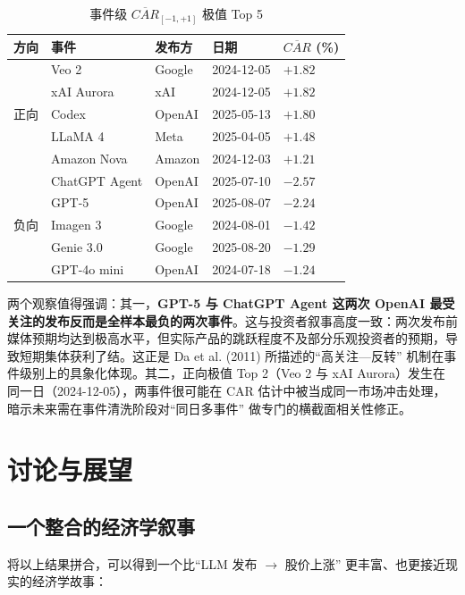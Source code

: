 \documentclass[11pt]{ctexart}
\begin{document}
\begin{table}[htbp]
\centering
\caption{事件级 $\overline{CAR}_{[-1,+1]}$ 极值 Top 5}
\label{tab:extreme}
\small
\begin{tabular}{llll>{\centering\arraybackslash}p{2.2cm}}
\toprule
方向 & 事件 & 发布方 & 日期 & $\overline{CAR}$ (\%) \\
\midrule
\multirow{5}{*}{正向}
  & Veo 2       & Google    & 2024-12-05 & $+1.82$ \\
  & xAI Aurora  & xAI       & 2024-12-05 & $+1.82$ \\
  & Codex       & OpenAI    & 2025-05-13 & $+1.80$ \\
  & LLaMA 4     & Meta      & 2025-04-05 & $+1.48$ \\
  & Amazon Nova & Amazon    & 2024-12-03 & $+1.21$ \\
\midrule
\multirow{5}{*}{负向}
  & ChatGPT Agent & OpenAI & 2025-07-10 & $-2.57$ \\
  & GPT-5         & OpenAI & 2025-08-07 & $-2.24$ \\
  & Imagen 3      & Google & 2024-08-01 & $-1.42$ \\
  & Genie 3.0     & Google & 2025-08-20 & $-1.29$ \\
  & GPT-4o mini   & OpenAI & 2024-07-18 & $-1.24$ \\
\bottomrule
\end{tabular}
\end{table}

两个观察值得强调：其一，\textbf{GPT-5 与 ChatGPT Agent 这两次 OpenAI 最受关注的发布反而是全样本最负的两次事件}。这与投资者叙事高度一致：两次发布前媒体预期均达到极高水平，但实际产品的跳跃程度不及部分乐观投资者的预期，导致短期集体获利了结。这正是 Da et al. (2011) 所描述的“高关注—反转” 机制在事件级别上的具象化体现。其二，正向极值 Top 2（Veo 2 与 xAI Aurora）发生在同一日（2024-12-05），两事件很可能在 CAR 估计中被当成同一市场冲击处理，暗示未来需在事件清洗阶段对“同日多事件” 做专门的横截面相关性修正。

\section{讨论与展望}
\label{sec:discuss}

\subsection{一个整合的经济学叙事}

将以上结果拼合，可以得到一个比“LLM 发布 $\to$ 股价上涨” 更丰富、也更接近现实的经济学故事：
\end{document}
